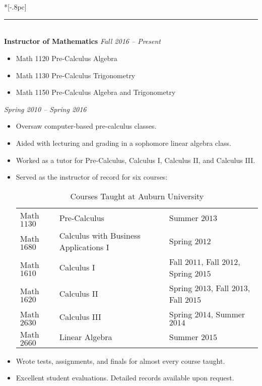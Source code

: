 \documentclass{article}
\begin{document}
\

 \\*[-.8pc]
\rule{\textwidth}{.1pt} \\
\textbf{Instructor of Mathematics} \hfill \textit{Fall 2016 -- Present}
\begin{itemize}[noitemsep]
\item Math 1120 Pre-Calculus Algebra
\item Math 1130 Pre-Calculus Trigonometry
\item Math 1150 Pre-Calculus Algebra and Trigonometry
\end{itemize}

 \hfill {\it Spring 2010 --
  Spring 2016\/}
\begin{itemize}[noitemsep]
\item Oversaw computer-based pre-calculus classes.
\item Aided with lecturing and grading in a sophomore
  linear algebra class.  
\item Worked as a tutor for Pre-Calculus, Calculus I, Calculus II, and
  Calculus III.  
\item Served as the instructor of record for six courses:
\begin{table}[H]
\begin{center}
\begin{tabular}{lll}
Math $1130$ & Pre-Calculus & Summer $2013$ \\
Math $1680$ & Calculus with Business Applications I & Spring $2012$ \\
Math $1610$ & Calculus I & Fall $2011$, Fall $2012$, Spring $2015$ \\
Math $1620$ & Calculus II & Spring $2013$, Fall $2013$, Fall $2015$ \\
Math $2630$ & Calculus III & Spring $2014$, Summer $2014$ \\
Math $2660$ & Linear Algebra & Summer $2015$ \\
[-1pc]
\end{tabular}
\end{center}
\caption{Courses Taught at Auburn University}%
\end{table}
\item Wrote tests, assignments, and finals for almost every course taught.
\item Excellent student evaluations. Detailed records available upon
  request.
\end{itemize}
\end{document}
